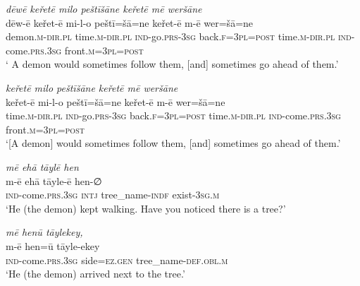 \ea \label{ŽP.192}
\textit{dēwē keřetē milo peštīšāne keřetē mē weršāne} \\ 
\gll dēw-ē keřet-ē mi-l-o peštī=šā=ne keřet-ē m-ē wer=šā=ne \\ 
 demon\textsc{.m}\textsc{-dir}\textsc{.pl} time\textsc{.m}\textsc{-dir}\textsc{.pl} \textsc{ind-}go\textsc{.prs}\textsc{-3sg} back\textsc{.f}\textsc{=3pl}\textsc{=\textsc{post}} time\textsc{.m}\textsc{-dir}\textsc{.pl} \textsc{ind-}come\textsc{.prs}\textsc{.3sg} front\textsc{.m}\textsc{=3pl}\textsc{=\textsc{post}} \\ 
\glt ` A demon would sometimes follow them, [and] sometimes go ahead of them.'
\z 
 
\ea \label{ŽP.193}
\textit{keřetē milo peštīšāne keřetē mē weršāne} \\ 
\gll keřet-ē mi-l-o peštī=šā=ne keřet-ē m-ē wer=šā=ne \\ 
 time\textsc{.m}\textsc{-dir}\textsc{.pl} \textsc{ind-}go\textsc{.prs}\textsc{-3sg} back\textsc{.f}\textsc{=3pl}\textsc{=\textsc{post}} time\textsc{.m}\textsc{-dir}\textsc{.pl} \textsc{ind-}come\textsc{.prs}\textsc{.3sg} front\textsc{.m}\textsc{=3pl}\textsc{=\textsc{post}} \\ 
\glt `[A demon] would sometimes follow them, [and] sometimes go ahead of them.'
\z 
 
\ea \label{ŽP.195}
\textit{mē ehā tāylē hen} \\ 
\gll m-ē ehā tāyle-ē hen-∅ \\ 
 \textsc{ind-}come\textsc{.prs}\textsc{.3sg} \textsc{intj} tree\_name\textsc{-indf} exist\textsc{-3sg}\textsc{.m} \\ 
\glt `He (the demon) kept walking. Have you noticed there is a tree?'
\z 
 
\ea \label{ŽP.197}
\textit{mē henū tāylekey,} \\ 
\gll m-ē hen=ū tāyle-ekey \\ 
 \textsc{ind-}come\textsc{.prs}\textsc{.3sg} side\textsc{\textsc{=ez.gen}} tree\_name\textsc{-def}\textsc{.obl}\textsc{.m} \\ 
\glt `He (the demon) arrived next to the tree.'
\z 
 
